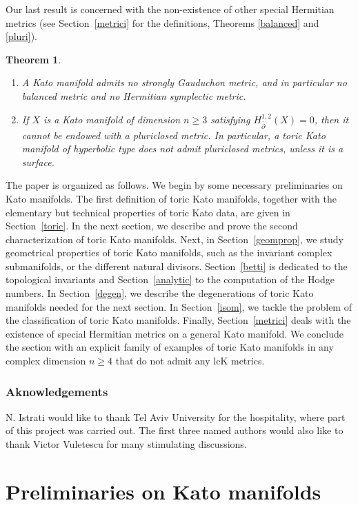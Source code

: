 \documentclass[JEP,XML,SOM,Unicode,NoFloatCountersInSection]{cedram}
\newtheorem{theorem}{Theorem}[section]
\theoremstyle{definition}
\begin{document}
Our last result is concerned with the non-existence of other special Hermitian metrics (see Section~\ref{metrici} for the definitions, Theorems \ref{balanced} and \ref{pluri}).

\skpt
\begin{theorem}
\begin{enumerate}
\item A Kato manifold admits no strongly Gauduchon metric, and in particular no balanced metric and no Hermitian symplectic metric.
\item If $X$ is a Kato manifold of dimension $n\geq 3$ satisfying $H^{1, 2}_{\overline{\partial}}(X)=0$, then it cannot be endowed with a pluriclosed metric. In particular, a toric Kato manifold of hyperbolic type does not admit pluriclosed metrics, unless it is a surface.
\end{enumerate}
\end{theorem}

The paper is organized as follows. We begin by some necessary preliminaries on Kato manifolds. The first definition of toric Kato manifolds, together with the elementary but technical properties of toric Kato data, are given in Section~\ref{toric}. In the next section, we describe and prove the second characterization of toric Kato manifolds. Next, in Section~\ref{geomprop}, we study geometrical properties of toric Kato manifolds, such as the invariant complex submanifolds, or the different natural divisors. Section~\ref{betti} is dedicated to the topological invariants and Section~\ref{analytic} to the computation of the Hodge numbers. In Section~\ref{degen}, we describe the degenerations of toric Kato manifolds needed for the next section. In Section~\ref{isom}, we tackle the problem of the classification of toric Kato manifolds. Finally, Section~\ref{metrici} deals with the existence of special Hermitian metrics on a general Kato manifold. We conclude the section with an explicit family of examples of toric Kato manifolds in any complex dimension $n \geq 4$ that do not admit any lcK metrics.

\subsubsection*{Aknowledgements}
N. Istrati would like to thank Tel Aviv University for the hospitality, where part of this project was carried out. The first three named authors would also like to thank Victor Vuletescu for many stimulating discussions.

\section{Preliminaries on Kato manifolds}\label{prel}
\end{document}
